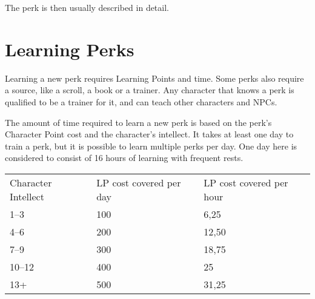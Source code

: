 The perk is then usually described in detail.

\section{Learning Perks}\label{sec:learningPerks}
Learning a new perk requires Learning Points and time.
Some perks also require a source, like a scroll, a book or a trainer.
Any character that knows a perk is qualified to be a trainer for it, and can teach other characters and NPCs.

The amount of time required to learn a new perk is based on the perk's Character Point cost and the character's intellect.
It takes at least one day to train a perk, but it is possible to learn multiple perks per day.
One day here is considered to consist of 16 hours of learning with frequent rests.\\

\begin{tabular}{l | l | l}
	Character Intellect & LP cost covered per day & LP cost covered per hour\\
	1--3 & 100 & 6,25\\
	4--6 & 200 & 12,50\\
	7--9 & 300 & 18,75\\
	10--12 & 400 & 25\\
	13+ & 500 & 31,25
\end{tabular}